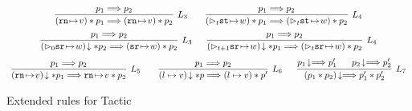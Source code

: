\begin{figure}[!t]
    \[
        \begin{array}{c}
            \infer[L_3]
            {
                (\regst{\regN}{\val}) \sepstar \astP_1 \Longrightarrow 
                (\regst{\regN}{\val}) \sepstar \astP_2
            }
            {
                \astP_1 \Longrightarrow \astP_2
            } \qquad 
            \infer[L_4]
            {
                (\dlyregst{t}{\st}{\word}) \sepstar \astP_1 \Longrightarrow 
                (\dlyregst{t}{\st}{\word}) \sepstar \astP_2
            }
            {
                \astP_1 \Longrightarrow \astP_2
            } \\
            \\[-5pt]
            \infer[L_3]
            {
                \nxtAst{(\dlyregst{0}{\sr}{\word})} \sepstar \astP_2 \Longrightarrow 
                (\regst{\sr}{\word}) \sepstar \astP_2
            }
            {
                \astP_1 \Longrightarrow \astP_2
            } \quad \ \ 
            \infer[L_4]
            {
                \nxtAst{(\dlyregst{t+1}{\sr}{\word})} \sepstar \astP_1 \Longrightarrow 
                (\dlyregst{t}{\sr}{\word}) \sepstar \astP_2
            }
            {
                \astP_1 \Longrightarrow \astP_2
            } \\
            \\[-5pt]
            \infer[L_5]
            {
                \nxtAst{(\regst{\regN}{\val})} \sepstar \astP_1 \Longrightarrow 
                \regst{\regN}{\val} \sepstar \astP_2
            }
            {
                \astP_1 \Longrightarrow \astP_2
            } \qquad 
            \infer[L_6]
            {
                \nxtAst{(\sepsto{\loc}{\val})} \sepstar \astP \Longrightarrow 
                (\sepsto{\loc}{\val}) \sepstar \astP'
            }
            {
                \astP_1 \Longrightarrow \astP_2
            } \quad \ \
            \infer[L_7]
            {
                \nxtAst{(\astP_1 \sepstar \astP_2)}
                \Longrightarrow 
                \astP_1' \sepstar \astP_2'
            }
            {
                \nxtAst{\astP_1} \Longrightarrow \astP_1' \quad \ \ 
                \nxtAst{\astP_2} \Longrightarrow \astP_2'
            } 
        \end{array}
    \]
    \caption{Extended rules for Tactic \sepcancel{}}
    \label{fig:ext-rule-tac-sepcancel}
\end{figure}
